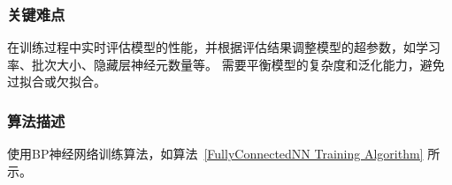 \documentclass[12pt]{article}
\begin{document}
\subsubsection{关键难点}
在训练过程中实时评估模型的性能，并根据评估结果调整模型的超参数，如学习率、批次大小、隐藏层神经元数量等。
需要平衡模型的复杂度和泛化能力，避免过拟合或欠拟合。

\subsubsection{算法描述}
使用BP神经网络训练算法，如算法~\ref{FullyConnectedNN Training Algorithm} 所示。
\end{document}
